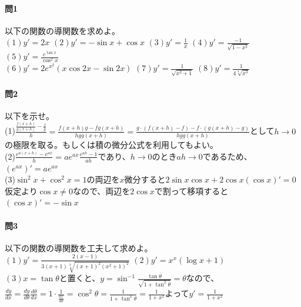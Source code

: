 \documentclass[a4j,dvipdfmx]{jsarticle}
\begin{document}
                \paragraph{問1}以下の関数の導関数を求めよ。\\
                $(1)y'=2x$\hspace{2mm}
                $(2)y'=-\sin x+\cos x$\hspace{2mm}
                $(3)y'=\frac{1}{x}$\hspace{2mm}
                $(4)y'=\frac{-1}{\sqrt{1-x^2}}$\hspace{2mm}
                $(5)y'=\frac{e^{\tan x}}{\cos^2 x}$\\
                $(6)y'=2e^{x^2}(x\cos2x-\sin 2x)$\hspace{3mm}
                $(7)y'=\frac{1}{\sqrt{x^2+1}}$\hspace{3mm}
                $(8)y'=\frac{1}{4\sqrt[4]{x^3}}$

                \paragraph{問2}以下を示せ。\\
                (1)$\displaystyle\frac{\frac{f(x+h)}{g(x+h)}-\frac{f}{g}}{h}=\frac{f(x+h)g-fg(x+h)}{hgg(x+h)}=\frac{g\cdot(f(x+h)-f)-f\cdot(g(x+h)-g)}{hgg(x+h)}$として$h\to0$の極限を取る。もしくは積の微分公式を利用してもよい。\\
                (2)$\displaystyle\frac{e^{a(x+h)}-e^{ax}}{h}=ae^{ax}\frac{e^{ah}-1}{ah}$であり、$h\to0$のとき$ah\to 0$であるため、$(e^{ax})'=ae^{ax}$\\
                (3)$\sin^2 x+\cos ^2 x=1$の両辺を$x$微分すると$2\sin x\cos x+2\cos x(\cos x)'=0$仮定より$\cos x\neq 0$なので、両辺を$2\cos x$で割って移項すると$(\cos x)'=-\sin x$

                \paragraph{問3}以下の関数の導関数を工夫して求めよ。\\
                $\displaystyle(1)y'=\frac{2(x-1)}{3(x+1)\sqrt[3]{(x+1)^2(x^2+1)^2}}$\hspace{3mm}
                $(2)y'=x^x(\log x+1)$\\
                $(3)x=\tan \theta$と置くと、$\displaystyle y=\sin^{-1}\frac{\tan \theta}{\sqrt{1+\tan^2\theta}}=\theta$なので、\\
                $\displaystyle \frac{dy}{dx}=\frac{dy}{d\theta}\frac{d\theta}{dx}=1\cdot\frac{1}{\frac{dx}{d\theta}}=\cos^2 \theta=\frac{1}{1+\tan^2\theta}=\frac{1}{1+x^2}$よって$\displaystyle y'=\frac{1}{1+x^2}$
\end{document}
